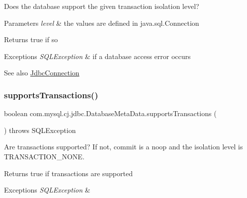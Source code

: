 Does the database support the given transaction isolation level?


\begin{DoxyParams}{Parameters}
{\em level} & the values are defined in java.\+sql.\+Connection \\
\hline
\end{DoxyParams}
\begin{DoxyReturn}{Returns}
true if so 
\end{DoxyReturn}

\begin{DoxyExceptions}{Exceptions}
{\em S\+Q\+L\+Exception} & if a database access error occurs \\
\hline
\end{DoxyExceptions}
\begin{DoxySeeAlso}{See also}
\mbox{\hyperlink{interfacecom_1_1mysql_1_1cj_1_1jdbc_1_1_jdbc_connection}{Jdbc\+Connection}} 
\end{DoxySeeAlso}
\mbox{\label{classcom_1_1mysql_1_1cj_1_1jdbc_1_1_database_meta_data_aab0d5f01f66685c7da3527767754ff4c}} 
\subsubsection{\texorpdfstring{supports\+Transactions()}{supportsTransactions()}}
{\footnotesize\ttfamily boolean com.\+mysql.\+cj.\+jdbc.\+Database\+Meta\+Data.\+supports\+Transactions (\begin{DoxyParamCaption}{ }\end{DoxyParamCaption}) throws S\+Q\+L\+Exception}

Are transactions supported? If not, commit is a noop and the isolation level is T\+R\+A\+N\+S\+A\+C\+T\+I\+O\+N\+\_\+\+N\+O\+NE.

\begin{DoxyReturn}{Returns}
true if transactions are supported 
\end{DoxyReturn}

\begin{DoxyExceptions}{Exceptions}
{\em S\+Q\+L\+Exception} & \\
\hline
\end{DoxyExceptions}
\mbox{\label{classcom_1_1mysql_1_1cj_1_1jdbc_1_1_database_meta_data_a218eedd538cef52ef140cad36c418093}} 
